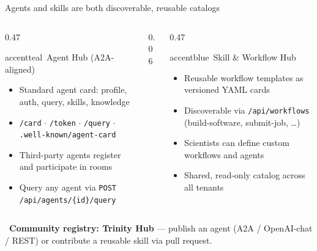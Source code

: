 \documentclass[aspectratio=169,11pt]{beamer}
\begin{document}
\begin{frame}{Agents and skills are both discoverable, reusable catalogs}
  \begin{columns}[t, totalwidth=\textwidth]
    \begin{column}{0.47\textwidth}
      \begin{featbox}{accentteal}{\faRobot\ Agent Hub (A2A-aligned)}
        \scriptsize
        \begin{itemize}\itemsep1pt
          \item Standard agent card: profile, auth, query, skills, knowledge
          \item \texttt{/card} $\cdot$ \texttt{/token} $\cdot$ \texttt{/query} $\cdot$ \texttt{.well-known/agent-card}
          \item Third-party agents register and participate in rooms
          \item Query any agent via \texttt{POST /api/agents/\{id\}/query}
        \end{itemize}
      \end{featbox}
    \end{column}
    \begin{column}{0.06\textwidth}\end{column}
    \begin{column}{0.47\textwidth}
      \begin{featbox}{accentblue}{\faTools\ Skill \& Workflow Hub}
        \scriptsize
        \begin{itemize}\itemsep1pt
          \item Reusable workflow templates as versioned YAML cards
          \item Discoverable via \texttt{/api/workflows} (build-software, submit-job, \ldots)
          \item Scientists can define custom workflows and agents
          \item Shared, read-only catalog across all tenants
        \end{itemize}
      \end{featbox}
    \end{column}
  \end{columns}
  \vspace{2pt plus 1pt minus 2pt}
  \begin{center}
  \begin{tcolorbox}[enhanced, colback=labnavy!6, colframe=labnavy, boxrule=0.6pt,
    arc=3pt, width=0.9\linewidth, left=10pt, right=10pt, top=1pt, bottom=1pt,
    drop fuzzy shadow]
    \centering\footnotesize
    \faGithub\ \textbf{Community registry: Trinity Hub} --- publish an agent (A2A / OpenAI-chat / REST)
    or contribute a reusable skill via pull request.
  \end{tcolorbox}
  \end{center}
\end{frame}
\end{document}
